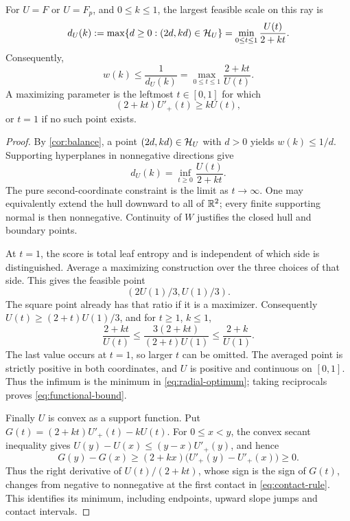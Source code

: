 \begin{theorem}\label{thm:shape-optimization}
For \(U=F\) or \(U=F_p\), and \(0\le k\le1\),
the largest feasible scale on this ray is
\begin{equation}\label{eq:radial-optimum}
 d_U(k):=\max\{d\ge0:(2d,kd)\in\mathcal H_U\}
       =\min_{0\le t\le1}\frac{U(t)}{2+kt}.
\end{equation}
Consequently,
\begin{equation}\label{eq:functional-bound}
 w(k)\le\frac1{d_U(k)}
      =\max_{0\le t\le1}\frac{2+kt}{U(t)}.
\end{equation}
A maximizing parameter is the leftmost \(t\in[0,1]\) for which
\begin{equation}\label{eq:contact-rule}
 (2+kt)U'_+(t)\ge kU(t),
\end{equation}
or \(t=1\) if no such point exists.
\end{theorem}

\begin{proof}
By \cref{cor:balance}, a point \((2d,kd)\in\mathcal H_U\) with \(d>0\) yields
\(w(k)\le1/d\).
Supporting hyperplanes in nonnegative directions give
\[
 d_U(k)
    =\inf_{t\ge0}\frac{U(t)}{2+kt}.
\]
The pure second-coordinate constraint is the limit as \(t\to\infty\).
One may equivalently extend the hull downward to all of \(\mathbb R^2\);
every finite supporting normal is then nonnegative.
Continuity of \(W\) justifies the closed hull and boundary points.

At \(t=1\), the score is total leaf entropy and is independent of
which side is distinguished.
Average a maximizing construction over the three choices of that side.
This gives the feasible point
\[
 (2U(1)/3,U(1)/3).
\]
The square point already has that ratio if it is a maximizer.
Consequently \(U(t)\ge(2+t)U(1)/3\), and for \(t\ge1\), \(k\le1\),
\[
 \frac{2+kt}{U(t)}
 \le \frac{3(2+kt)}{(2+t)U(1)}
 \le \frac{2+k}{U(1)}.
\]
The last value occurs at \(t=1\), so larger \(t\) can be omitted.
The averaged point is strictly positive in both coordinates, and
\(U\) is positive and continuous on \([0,1]\).
Thus the infimum is the minimum in \eqref{eq:radial-optimum}; taking
reciprocals proves \eqref{eq:functional-bound}.

Finally \(U\) is convex as a support function.
Put \(G(t)=(2+kt)U'_+(t)-kU(t)\).
For \(0\le x<y\), the convex secant inequality gives
\(U(y)-U(x)\le(y-x)U'_+(y)\), and hence
\[
 G(y)-G(x)
 \ge (2+kx)\bigl(U'_+(y)-U'_+(x)\bigr)\ge0.
\]
Thus the right derivative of \(U(t)/(2+kt)\), whose sign is the sign
of \(G(t)\), changes from negative to nonnegative at the first
contact in \eqref{eq:contact-rule}.  This identifies its minimum,
including endpoints, upward slope jumps and contact intervals.
\end{proof}

